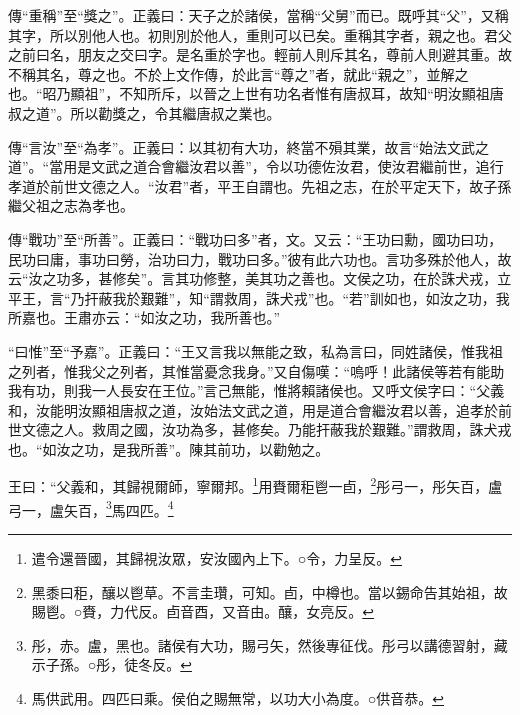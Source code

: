 {\noindent\zhuan{}\fzbyks 傳“重稱”至“獎之”。正義曰：天子之於諸侯，當稱“父舅”而已。既呼其“父”，又稱其字，所以別他人也。初則別於他人，重則可以已矣。重稱其字者，親之也。君父之前曰名，朋友之交曰字。是名重於字也。輕前人則斥其名，尊前人則避其重。故不稱其名，尊之也。不於上文作傳，於此言“尊之”者，就此“親之”，並解之也。“昭乃顯祖”，不知所斥，以晉之上世有功名者惟有唐叔耳，故知“明汝顯祖唐叔之道”。所以勸獎之，令其繼唐叔之業也。 \par}

{\noindent\zhuan{}\fzbyks 傳“言汝”至“為孝”。正義曰：以其初有大功，終當不殞其業，故言“始法文武之道”。“當用是文武之道合會繼汝君以善”，令以功德佐汝君，使汝君繼前世，追行孝道於前世文德之人。“汝君”者，平王自謂也。先祖之志，在於平定天下，故子孫繼父祖之志為孝也。 \par}

{\noindent\zhuan{}\fzbyks 傳“戰功”至“所善”。正義曰：“戰功曰多”者，文。又云：“王功曰勳，國功曰功，民功曰庸，事功曰勞，治功曰力，戰功曰多。”彼有此六功也。言功多殊於他人，故云“汝之功多，甚修矣”。言其功修整，美其功之善也。文侯之功，在於誅犬戎，立平王，言“乃扞蔽我於艱難”，知“謂救周，誅犬戎”也。“若”訓如也，如汝之功，我所嘉也。王肅亦云：“如汝之功，我所善也。” \par}

{\noindent\shu{}\fzkt “曰惟”至“予嘉”。正義曰：“王又言我以無能之致，私為言曰，同姓諸侯，惟我祖之列者，惟我父之列者，其惟當憂念我身。”又自傷嘆：“嗚呼！此諸侯等若有能助我有功，則我一人長安在王位。”言己無能，惟將賴諸侯也。又呼文侯字曰：“父義和，汝能明汝顯祖唐叔之道，汝始法文武之道，用是道合會繼汝君以善，追孝於前世文德之人。救周之國，汝功為多，甚修矣。乃能扞蔽我於艱難。”謂救周，誅犬戎也。“如汝之功，是我所善”。陳其前功，以勸勉之。 \par}

王曰：“父義和，其歸視爾師，寧爾邦。\footnote{遣令還晉國，其歸視汝眾，安汝國內上下。○令，力呈反。}用賚爾秬鬯一卣，\footnote{黑黍曰秬，釀以鬯草。不言圭瓚，可知。卣，中樽也。當以錫命告其始祖，故賜鬯。○賚，力代反。卣音酉，又音由。釀，女亮反。}彤弓一，彤矢百，盧弓一，盧矢百，\footnote{彤，赤。盧，黑也。諸侯有大功，賜弓矢，然後專征伐。彤弓以講德習射，藏示子孫。○彤，徒冬反。}馬四匹。\footnote{馬供武用。四匹曰乘。侯伯之賜無常，以功大小為度。○供音恭。}


